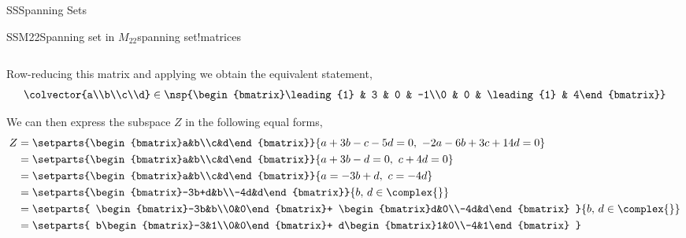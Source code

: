 \begin{subsect}{SS}{Spanning Sets}
\begin{example}{SSM22}{Spanning set in $M_{22}$}{spanning set!matrices}
\begin{para}
\begin{equation*}
\end{equation*}
\end{para}
%
\begin{para}Row-reducing this matrix and applying  we obtain the equivalent statement,
%
\begin{equation*}
\colvector{a\\b\\c\\d}\in
\nsp{\begin{bmatrix}\leading{1} & 3 & 0 & -1\\0 & 0 & \leading{1} & 4\end{bmatrix}}
\end{equation*}
\end{para}
%
\begin{para}We can then express the subspace $Z$ in the following equal forms,
%
\begin{align*}
Z&=\setparts{\begin{bmatrix}a&b\\c&d\end{bmatrix}}{a+3b-c-5d=0,\ -2a-6b+3c+14d=0}\\
&=\setparts{\begin{bmatrix}a&b\\c&d\end{bmatrix}}{a+3b-d=0,\ c+4d=0}\\
&=\setparts{\begin{bmatrix}a&b\\c&d\end{bmatrix}}{a=-3b+d,\ c=-4d}\\
&=\setparts{\begin{bmatrix}-3b+d&b\\-4d&d\end{bmatrix}}{b,\,d\in\complex{\null}}\\
%
&=\setparts{
\begin{bmatrix}-3b&b\\0&0\end{bmatrix}+
\begin{bmatrix}d&0\\-4d&d\end{bmatrix}
}{b,\,d\in\complex{\null}}\\
%
&=\setparts{
b\begin{bmatrix}-3&1\\0&0\end{bmatrix}+
d\begin{bmatrix}1&0\\-4&1\end{bmatrix}
}
\end{align*}
\end{para}
\end{example}
\end{subsect}
